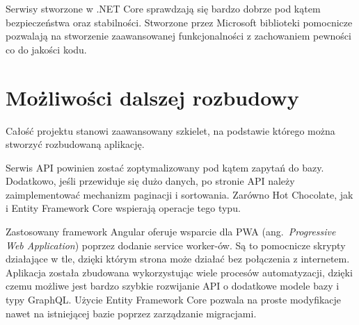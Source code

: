 	Serwisy stworzone w .NET Core sprawdzają się bardzo dobrze pod kątem bezpieczeństwa oraz stabilności.
	Stworzone przez Microsoft biblioteki pomocnicze pozwalają na stworzenie zaawansowanej funkcjonalności
	z zachowaniem pewności co do jakości kodu.

	
\section{Możliwości dalszej rozbudowy}
	Całość projektu stanowi zaawansowany szkielet, na podstawie którego można stworzyć rozbudowaną aplikację.

	Serwis API powinien zostać zoptymalizowany pod kątem zapytań do bazy.
	Dodatkowo, jeśli przewiduje się dużo danych, po stronie API należy zaimplementować mechanizm paginacji i sortowania.
	Zarówno Hot Chocolate, jak i Entity Framework Core wspierają operacje tego typu.

	Zastosowany framework Angular oferuje wsparcie dla PWA (ang.\ \emph{Progressive Web Application}) poprzez dodanie service worker-ów.
	Są to pomocnicze skrypty działające w tle, dzięki którym strona może działać bez połączenia z internetem.
	Aplikacja została zbudowana wykorzystując wiele procesów automatyzacji, dzięki czemu możliwe jest bardzo szybkie rozwijanie API o dodatkowe modele bazy i typy GraphQL.
	Użycie Entity Framework Core pozwala na proste modyfikacje nawet na istniejącej bazie poprzez zarządzanie migracjami.


